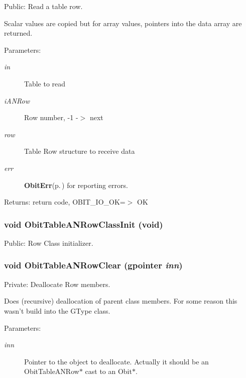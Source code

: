 Public: Read a table row. 

Scalar values are copied but for array values, pointers into the data array are returned. \begin{Desc}
\item[Parameters:]
\begin{description}
\item[{\em in}]Table to read \item[{\em i\-ANRow}]Row number, -1 -$>$ next \item[{\em row}]Table Row structure to receive data \item[{\em err}]{\bf Obit\-Err}{\rm (p.\,\pageref{structObitErr})} for reporting errors. \end{description}
\end{Desc}
\begin{Desc}
\item[Returns:]return code, OBIT\_\-IO\_\-OK=$>$ OK \end{Desc}
\subsubsection{\setlength{\rightskip}{0pt plus 5cm}void Obit\-Table\-ANRow\-Class\-Init (void)}\label{ObitTableAN_8c_a26}


Public: Row Class initializer. 

\subsubsection{\setlength{\rightskip}{0pt plus 5cm}void Obit\-Table\-ANRow\-Clear (gpointer {\em inn})}\label{ObitTableAN_8c_a7}


Private: Deallocate Row members. 

Does (recursive) deallocation of parent class members. For some reason this wasn't build into the GType class. \begin{Desc}
\item[Parameters:]
\begin{description}
\item[{\em inn}]Pointer to the object to deallocate. Actually it should be an Obit\-Table\-ANRow$\ast$ cast to an Obit$\ast$. \end{description}
\end{Desc}
